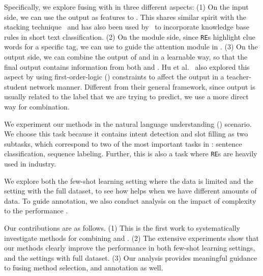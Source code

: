 

Specifically, we explore fusing \RE with \NN in three different aspects: (1) On the \NN input side, we can use the \RE output as features
to \NN. This shares similar spirit with the stacking technique~\cite{wolpert1992stacked} and has also been used by~\cite{wangcombining17}
to incorporate knowledge base rules in short text classification.
(2) On the \NN module side, since \texttt{RE}s highlight clue words for a
specific tag, we can use \RE to guide the attention module in \NN. (3) On the \NN output side, we can combine the output of \RE and \NN in
a learnable way, so that the final output contains information from both \NN and \RE. Hu et al.~ also explored
this aspect by using first-order-logic (\FOL) constraints to affect the \NN output in a teacher-student network manner. Different from
their general framework, since \RE output is usually related to the label that we are trying to predict, we use a more direct way for
combination.

We experiment our methods in the natural language understanding (\NLU) scenario. We choose this task because it contains intent detection
and slot filling as two subtasks, which correspond to two of the most important tasks in \NLP: sentence classification, sequence labeling.
Further, this is also a task where \texttt{RE}s are heavily used in industry.

We explore both the few-shot learning setting where the data is limited and the setting with the full dataset, to see how \RE helps when we have different amounts of data.
To guide \RE annotation, we also conduct analysis on the impact of \RE complexity to the performance \NN.

Our contributions are as follows. (1) This is the first work to systematically investigate methods for combining \RE and \NN. (2) The
extensive experiments show that our methods clearly improve the \NN performance in both few-shot learning settings, and the settings with
full dataset. (3) Our analysis provides meaningful guidance to fusing method selection, and \RE annotation as well.
